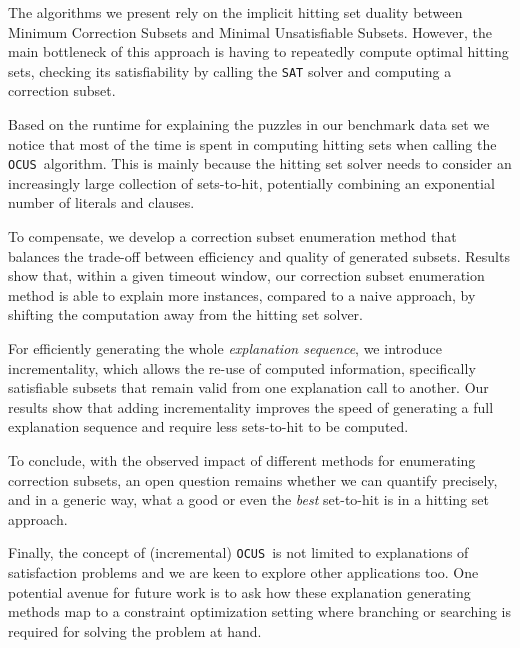 \documentclass[a4paper,UKenglish,cleveref, autoref, thm-restate, pdfa]{lipics-v2021}
\newcommand\sat{\texttt{{SAT}}\xspace}
\newcommand\comus{\texttt{OCUS}}
\begin{document}
The algorithms we present rely on the implicit hitting set duality between Minimum Correction Subsets and Minimal Unsatisfiable Subsets.
However, the main bottleneck of this approach is having to repeatedly compute optimal hitting sets, checking its satisfiability by calling the \sat solver and computing a correction subset.

Based on the runtime for explaining the puzzles in our benchmark data set we notice that most of the time is spent in computing hitting sets when calling the \comus~algorithm.
This is mainly because the hitting set solver needs to consider an increasingly large collection of sets-to-hit, potentially combining an exponential number of literals and clauses.

To compensate, we develop a correction subset enumeration method that balances the trade-off between efficiency and quality of generated subsets.
Results show that, within a given timeout window, our correction subset enumeration method is able to explain more instances, compared to a naive approach, by shifting the computation away from the hitting set solver.

For efficiently generating the whole \emph{explanation sequence}, we introduce incrementality, which allows the re-use of computed information, specifically satisfiable subsets that remain valid from one explanation call to another.
Our results show that adding incrementality improves the speed of generating a full explanation sequence and require less sets-to-hit to be computed.


To conclude, with the observed impact of different methods for enumerating correction subsets, an open question remains whether we can quantify precisely, and in a generic way, what a good or even the \emph{best} set-to-hit is in a hitting set approach. 



Finally, the concept of (incremental) \comus~is not limited to explanations of satisfaction problems and we are keen to explore other applications too.
One potential avenue for future work is to ask how these explanation generating methods map to a constraint optimization setting where branching or searching is required for solving the problem at hand. 

\end{document}
